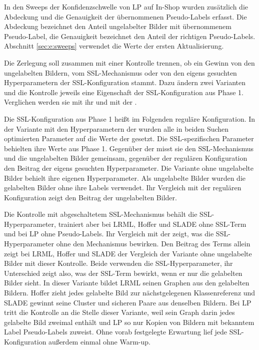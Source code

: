 In den Sweeps der Konfidenzschwelle von \ac{LP} auf In-Shop wurden zusätzlich die Abdeckung und die Genauigkeit der übernommenen Pseudo-Labels erfasst. Die Abdeckung bezeichnet den Anteil ungelabelter Bilder mit übernommenem Pseudo-Label, die Genauigkeit bezeichnet den Anteil der richtigen Pseudo-Labels. Abschnitt \ref{sec:e:sweeps} verwendet die Werte der ersten Aktualisierung.

Die Zerlegung soll zusammen mit einer Kontrolle trennen, ob ein Gewinn von den ungelabelten Bildern, vom \ac{SSL}-Mechanismus oder von den eigens gesuchten Hyperparametern der \ac{SSL}-Konfiguration stammt. Dazu ändern zwei Varianten und die Kontrolle jeweils eine Eigenschaft der \ac{SSL}-Konfiguration aus Phase 1. Verglichen werden sie mit ihr und mit der \UEBL.

Die \ac{SSL}-Konfiguration aus Phase 1 heißt im Folgenden reguläre Konfiguration. In der Variante mit den Hyperparametern der \UEBL wurden alle in beiden Suchen optimierten Parameter auf die Werte der \UEBL gesetzt. Die \ac{SSL}-spezifischen Parameter behielten ihre Werte aus Phase 1. Gegenüber der \UEBL misst sie den \ac{SSL}-Mechanismus und die ungelabelten Bilder gemeinsam, gegenüber der regulären Konfiguration den Beitrag der eigens gesuchten Hyperparameter. Die Variante ohne ungelabelte Bilder behielt ihre eigenen Hyperparameter. Als ungelabelte Bilder wurden die gelabelten Bilder ohne ihre Labels verwendet. Ihr Vergleich mit der regulären Konfiguration zeigt den Beitrag der ungelabelten Bilder.

Die Kontrolle mit abgeschaltetem \ac{SSL}-Mechanismus behält die \ac{SSL}-Hyperparameter, trainiert aber bei \ac{LRML}, Hoffer und \ac{SLADE} ohne \ac{SSL}-Term und bei \ac{LP} ohne Pseudo-Labels. Ihr Vergleich mit der \UEBL zeigt, was die \ac{SSL}-Hyperparameter ohne den Mechanismus bewirken. Den Beitrag des Terms allein zeigt bei \ac{LRML}, Hoffer und \ac{SLADE} der Vergleich der Variante ohne ungelabelte Bilder mit dieser Kontrolle. Beide verwenden die \ac{SSL}-Hyperparameter, ihr Unterschied zeigt also, was der \ac{SSL}-Term bewirkt, wenn er nur die gelabelten Bilder sieht. In dieser Variante bildet \ac{LRML} seinen Graphen aus den gelabelten Bildern. Hoffer zieht jedes gelabelte Bild zur nächstgelegenen Klassenreferenz und \ac{SLADE} gewinnt seine Cluster und sicheren Paare aus denselben Bildern. Bei \ac{LP} tritt die Kontrolle an die Stelle dieser Variante, weil sein Graph darin jedes gelabelte Bild zweimal enthält und \ac{LP} so nur Kopien von Bildern mit bekanntem Label Pseudo-Labels zuweist. Ohne vorab festgelegte Erwartung lief jede \ac{SSL}-Konfiguration außerdem einmal ohne Warm-up.

